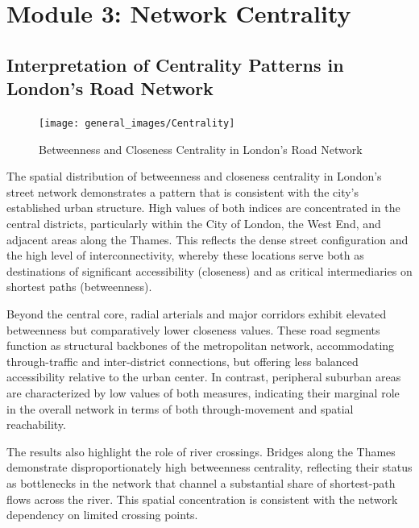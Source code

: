 \documentclass[
  12pt,
  oneside]{book}
\begin{document}
\section{Module 3: Network Centrality}\label{module-3-network-centrality}

\subsection{Interpretation of Centrality Patterns in London's Road Network}\label{interpretation-of-centrality-patterns-in-londons-road-network}

\begin{figure}

{\centering \texttt{[image: general\_images/Centrality]} 

}

\caption{Betweenness and Closeness Centrality in London's Road Network}\label{fig:Centrality}
\end{figure}

The spatial distribution of betweenness and closeness centrality in London's street network demonstrates a pattern that is consistent with the city's established urban structure. High values of both indices are concentrated in the central districts, particularly within the City of London, the West End, and adjacent areas along the Thames. This reflects the dense street configuration and the high level of interconnectivity, whereby these locations serve both as destinations of significant accessibility (closeness) and as critical intermediaries on shortest paths (betweenness).

Beyond the central core, radial arterials and major corridors exhibit elevated betweenness but comparatively lower closeness values. These road segments function as structural backbones of the metropolitan network, accommodating through-traffic and inter-district connections, but offering less balanced accessibility relative to the urban center. In contrast, peripheral suburban areas are characterized by low values of both measures, indicating their marginal role in the overall network in terms of both through-movement and spatial reachability.

The results also highlight the role of river crossings. Bridges along the Thames demonstrate disproportionately high betweenness centrality, reflecting their status as bottlenecks in the network that channel a substantial share of shortest-path flows across the river. This spatial concentration is consistent with the network dependency on limited crossing points.
\end{document}
